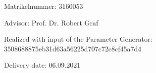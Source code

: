 \begin{large} 
\begin{center}
Matrikelnummer: 3160053
\end{center}
\end{large} 

\vspace*{-0mm}




\begin{large} 
\begin{center}
Advisor: Prof. Dr. Robert Graf
\end{center}
\end{large} 

\begin{large} 
\begin{center}
Realized with input of the Parameter Generator: \\3508688875eb31d63a56225d707c72c8cf45a7d4 
\end{center}
\end{large} 





\vspace*{-6mm}

\begin{large} 
\begin{center}
Delivery date: 06.09.2021
\end{center}
\end{large} 


\pagestyle{empty} %